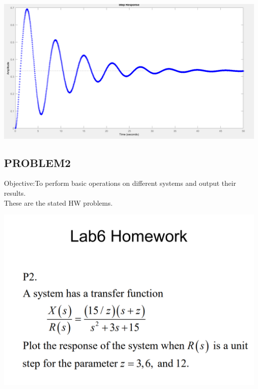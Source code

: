 \documentclass[12pt]{article}
\begin{document}
\includegraphics[scale=0.5]{../Lab6/HW_2_result2.png} \\

\cleardoublepage



 
\cleardoublepage
\subsection{PROBLEM2}
Objective:To perform basic operations on different systems and output their results.\\
These are the stated HW problems.

\includegraphics[scale=0.5]{../Lab6/HW_2.png} \\

\cleardoublepage
\end{document}
